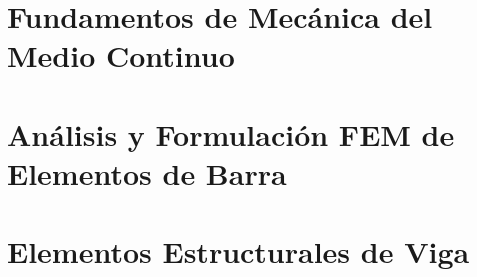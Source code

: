 \documentclass[11pt,twoside,openright]{book}
\begin{document}


\frontmatter

\tableofcontents



\mainmatter

\part{Fundamentos de Mecánica del Medio Continuo}




\part{Análisis y Formulación FEM de Elementos de Barra}






\part{Elementos Estructurales de Viga}








\appendix

\end{document}
